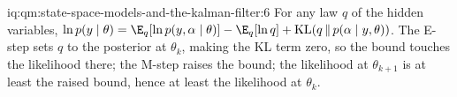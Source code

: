 \begin{solution}{iq:qm:state-space-models-and-the-kalman-filter:6}
For any law $q$ of the hidden variables, $\ln p(y \mid \theta) = \E_q[\ln p(y, \alpha \mid \theta)] - \E_q[\ln q] + \mathrm{KL}(q\,\|\,p(\alpha \mid y, \theta))$. The E-step sets $q$ to the
posterior at $\theta_k$, making the KL term zero, so the bound touches the likelihood there; the M-step raises the bound; the likelihood at $\theta_{k+1}$ is at least
the raised bound, hence at least the likelihood at $\theta_k$.
\end{solution}
